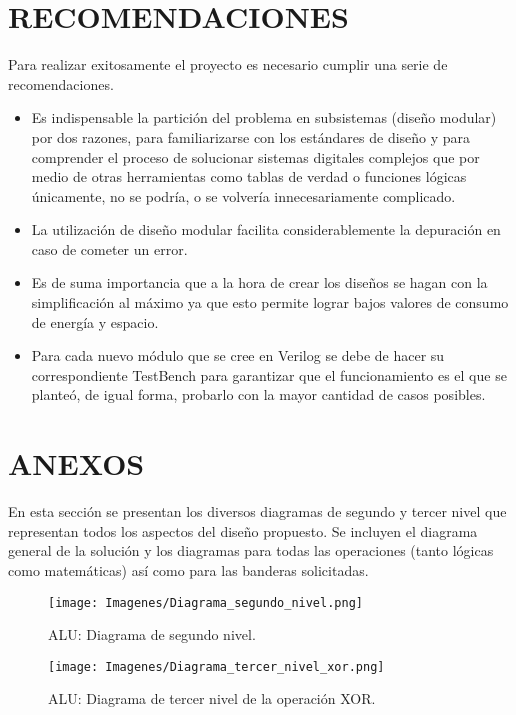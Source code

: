 \documentclass[journal,trans]{IEEEtran}
\begin{document}
\section{RECOMENDACIONES}
Para realizar exitosamente el proyecto es necesario cumplir una serie de recomendaciones.
\begin{itemize}
    \item Es indispensable la partición del problema en subsistemas (diseño modular) por dos razones, para familiarizarse con los estándares de diseño y para comprender el proceso de solucionar sistemas digitales complejos que por medio de otras herramientas como tablas de verdad o funciones lógicas únicamente, no se podría, o se volvería innecesariamente complicado.
    \item La utilización de diseño modular facilita considerablemente la depuración en caso de cometer un error.
    \item Es de suma importancia que a la hora de crear los diseños se hagan con la simplificación al máximo ya que esto permite lograr bajos valores de consumo de energía y espacio.
    \item Para cada nuevo módulo que se cree en Verilog se debe de hacer su correspondiente TestBench para garantizar que el funcionamiento es el que se planteó, de igual forma, probarlo con la mayor cantidad de casos posibles.
\end{itemize}


\section{ANEXOS}
En esta sección se presentan los diversos diagramas de segundo y tercer nivel que representan todos los aspectos del diseño propuesto. Se incluyen el diagrama general de la solución y los diagramas para todas las operaciones (tanto lógicas como matemáticas) así como para las banderas solicitadas.

\begin{figure}[h!]
	\centering
	\texttt{[image: Imagenes/Diagrama\_segundo\_nivel.png]}
	\caption{ALU: Diagrama de segundo nivel.}
	\label{fig:Diagrama_segundo_nivel}
\end{figure}

\begin{figure}[h!]
	\centering
	\texttt{[image: Imagenes/Diagrama\_tercer\_nivel\_xor.png]}
	\caption{ALU: Diagrama de tercer nivel de la operación XOR.}
	\label{fig:Diagrama_tercer_nivel_xor}
\end{figure}
\end{document}
